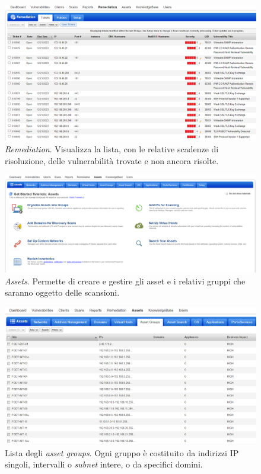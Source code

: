 \documentclass[target=mst,aauheader=]{thud}
\begin{document}
\begin{figure}
\centering
\includegraphics[scale=0.425]{images/qualys_remediation.png}
    \caption{\textit{Remediation}. Visualizza la lista, con le relative scadenze di risoluzione, delle vulnerabilità trovate e non ancora risolte.}
\end{figure}

\begin{figure}
\centering
\includegraphics[scale=0.329]{images/qualys_assets.png}
    \caption{\textit{Assets}. Permette di creare e gestire gli asset e i relativi gruppi che saranno oggetto delle scansioni.}
\end{figure}

\begin{figure}
    \centering
    \includegraphics[width=1\linewidth]{images/qualys_targets.png}
    \caption{Lista degli \textit{asset groups}. Ogni gruppo è costituito da indirizzi IP singoli, intervalli o \textit{subnet} intere, o da specifici domini.}
    \label{fig:qualys_targets}
\end{figure}
\end{document}
